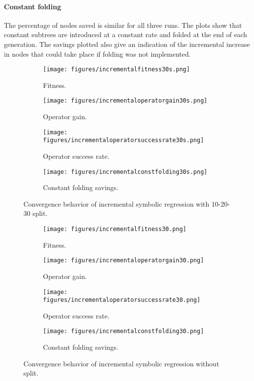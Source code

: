 \paragraph{Constant folding}
The percentage of nodes saved is similar for all three runs. The plots show that constant subtrees are introduced at a constant rate and folded at the end of each generation. The savings plotted also give an indication of the incremental increase in nodes that could take place if folding was not implemented. 
 \begin{figure}
    \begin{subfigure}{0.6\textwidth}
        \texttt{[image: figures/incrementalfitness30s.png]}
        \caption{Fitness.}
    \end{subfigure}
    \begin{subfigure}{0.6\textwidth}
        \texttt{[image: figures/incrementaloperatorgain30s.png]}
        \caption{Operator gain.}
    \end{subfigure}
        \begin{subfigure}{0.6\textwidth}
        \texttt{[image: figures/incrementaloperatorsuccessrate30s.png]}
        \caption{Operator success rate.}
    \end{subfigure}
    \begin{subfigure}{0.6\textwidth}
        \texttt{[image: figures/incrementalconstfolding30s.png]}
        \caption{Constant folding savings.}
    \end{subfigure}
    \caption{Convergence behavior of incremental symbolic regression with 10-20-30 split.}
    \label{fig:incrementalseededconvergence}
\end{figure}
 \begin{figure}
    \begin{subfigure}{0.6\textwidth}
        \texttt{[image: figures/incrementalfitness30.png]}
        \caption{Fitness.}
    \end{subfigure}
    \begin{subfigure}{0.6\textwidth}
        \texttt{[image: figures/incrementaloperatorgain30.png]}
        \caption{Operator gain.}
    \end{subfigure}
        \begin{subfigure}{0.6\textwidth}
        \texttt{[image: figures/incrementaloperatorsuccessrate30.png]}
        \caption{Operator success rate.}
    \end{subfigure}
    \begin{subfigure}{0.6\textwidth}
        \texttt{[image: figures/incrementalconstfolding30.png]}
        \caption{Constant folding savings.}
    \end{subfigure}
    \caption{Convergence behavior of incremental symbolic regression without split.}
    \label{fig:incrementalconvergence}
\end{figure}

